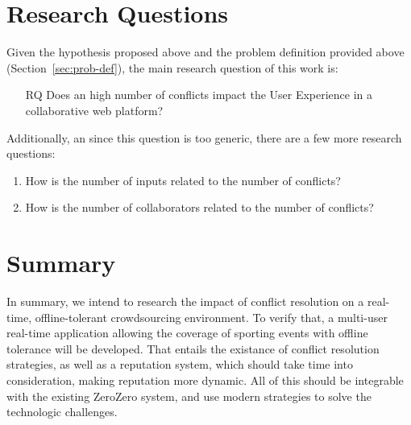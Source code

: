 \section{Research Questions}\label{sec:research-questions}

Given the hypothesis proposed above and the problem definition provided above (Section~\ref{sec:prob-def}), the main research question of this work is:

\begin{enumerate}[leftmargin  = 3.25\parindent, align=left]
    \item[RQ] Does an high number of conflicts impact the User Experience in a collaborative web platform?
\end{enumerate}

Additionally, an since this question is too generic, there are a few more research questions: 
\begin{enumerate}[leftmargin  = 3.25\parindent, align=left, label=RQ\arabic*, start=1]
    \item How is the number of inputs related to the number of conflicts?
    \item How is the number of collaborators related to the number of conflicts?
\end{enumerate}

\section{Summary}

In summary, we intend to research the impact of conflict resolution on a real-time, offline-tolerant crowdsourcing environment. To verify that, a multi-user real-time application allowing the coverage of sporting events with offline tolerance will be developed. That entails the existance of conflict resolution strategies, as well as a reputation system, which should take time into consideration, making reputation more dynamic. All of this should be integrable with the existing ZeroZero system, and use modern strategies to solve the technologic challenges.

